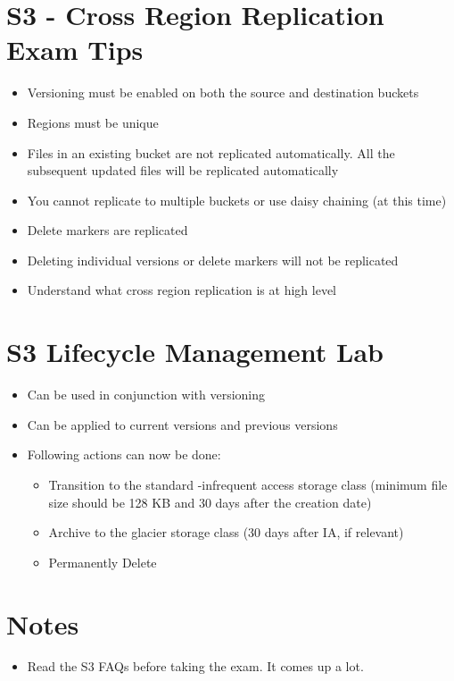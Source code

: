 \documentclass{report}
\begin{document}
\section*{S3 - Cross Region Replication Exam Tips}
\begin{itemize}
\item
Versioning must be enabled on both the source and destination buckets

\item
Regions must be unique

\item
Files in an existing bucket are not replicated automatically. All the subsequent updated files will be replicated automatically

\item
You cannot replicate to multiple buckets or use daisy chaining (at this time)

\item
Delete markers are replicated

\item
Deleting individual versions or delete markers will not be replicated

\item
Understand what cross region replication is at high level

\end{itemize}

\section*{S3 Lifecycle Management Lab}
\begin{itemize}

\item
Can be used in conjunction with versioning

\item
Can be applied to current versions and previous versions

\item
Following actions can now be done:
	\begin{itemize}
	\item
	Transition to the standard -infrequent access storage class (minimum file size should be 128 KB and 30 days after the creation date)
	
	\item
	Archive to the glacier storage class (30 days after IA, if relevant)
	
	\item
	Permanently Delete
	
	\end{itemize}

\end{itemize}

\section*{Notes}
\begin{itemize}
\item
Read the S3 FAQs before taking the exam. It comes up a lot.



\end{itemize}
\end{document}

